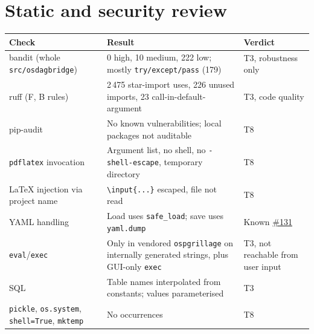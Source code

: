\documentclass[11pt,a4paper]{article}
\newcommand{\issue}[1]{\href{https://github.com/Nidhikhare12/OsdagBridge/issues/#1}{\##1}}
\begin{document}


\section{Static and security review}\label{sec:static}
\begin{longtable}{@{}L{4.6cm}L{6.6cm}L{4.6cm}@{}}
\toprule
Check & Result & Verdict \\
\midrule
\endhead
bandit (whole \texttt{src/osdagbridge}) & 0 high, 10 medium, 222 low; mostly \texttt{try/except/pass} (179) & T3, robustness only \\
ruff (F, B rules) & 2\,475 star-import uses, 226 unused imports, 23 call-in-default-argument & T3, code quality \\
pip-audit & No known vulnerabilities; local packages not auditable & T8 \\
\texttt{pdflatex} invocation & Argument list, no shell, no \texttt{-shell-escape}, temporary directory & T8 \\
LaTeX injection via project name & \texttt{\textbackslash input\{...\}} escaped, file not read & T8 \\
YAML handling & Load uses \texttt{safe\_load}; save uses \texttt{yaml.dump} & Known \issue{131} \\
\texttt{eval}/\texttt{exec} & Only in vendored \texttt{ospgrillage} on internally generated strings, plus GUI-only \texttt{exec} & T3, not reachable from user input \\
SQL & Table names interpolated from constants; values parameterised & T3 \\
\texttt{pickle}, \texttt{os.system}, \texttt{shell=True}, \texttt{mktemp} & No occurrences & T8 \\
\bottomrule
\end{longtable}

\end{document}
